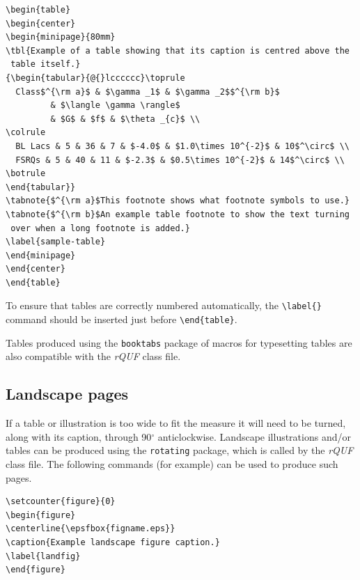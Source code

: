 \documentclass{rQUF2e}
\theoremstyle{plain}
\theoremstyle{definition}
\theoremstyle{remark}
\begin{document}
\begin{verbatim}
\begin{table}
\begin{center}
\begin{minipage}{80mm}
\tbl{Example of a table showing that its caption is centred above the
 table itself.}
{\begin{tabular}{@{}lcccccc}\toprule
  Class$^{\rm a}$ & $\gamma _1$ & $\gamma _2$$^{\rm b}$
         & $\langle \gamma \rangle$
         & $G$ & $f$ & $\theta _{c}$ \\
\colrule
  BL Lacs & 5 & 36 & 7 & $-4.0$ & $1.0\times 10^{-2}$ & 10$^\circ$ \\
  FSRQs & 5 & 40 & 11 & $-2.3$ & $0.5\times 10^{-2}$ & 14$^\circ$ \\
\botrule
\end{tabular}}
\tabnote{$^{\rm a}$This footnote shows what footnote symbols to use.}
\tabnote{$^{\rm b}$An example table footnote to show the text turning
 over when a long footnote is added.}
\label{sample-table}
\end{minipage}
\end{center}
\end{table}
\end{verbatim}

To ensure that tables are correctly numbered automatically, the
\verb"\label{}" command should be inserted just before \verb"\end{table}".

Tables produced using the \texttt{booktabs} package of macros for typesetting tables are also compatible with the \textit{rQUF} class file.


\subsection{Landscape pages}\label{landscape}

If a table or illustration is too wide to fit the measure it will need to be turned, along with its caption, through
90$^{\circ}$ anticlockwise. Landscape illustrations and/or tables can be produced using the \verb"rotating" package, which is called by the \textit{rQUF} class file. The following commands (for example) can be used
to produce such pages.
\begin{verbatim}
\setcounter{figure}{0}
\begin{figure}
\centerline{\epsfbox{figname.eps}}
\caption{Example landscape figure caption.}
\label{landfig}
\end{figure}
\end{verbatim}
\end{document}
